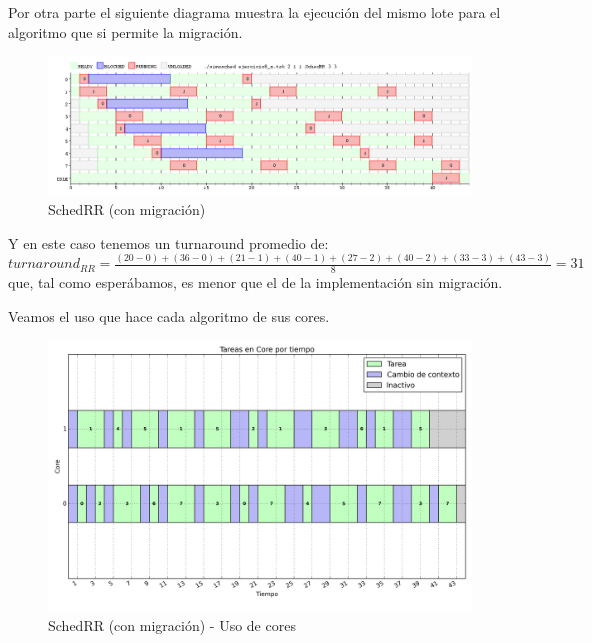\documentclass[a4paper,11pt]{article}
\begin{document}
		Por otra parte el siguiente diagrama muestra la ejecución del mismo lote para el algoritmo que si permite la migración.
		
		\begin{figure}[H]
		\centering
		\includegraphics[scale=.4, width=1\textwidth]{graficos/ej8-a1-2c}
		\caption{SchedRR (con migración)}
		\end{figure}

		Y en este caso tenemos un turnaround promedio de:\\
		
		\begin{math}
			turnaround_{RR} = \frac{(20-0)+(36-0)+(21-1)+(40-1)+(27-2)+(40-2)+(33-3)+(43-3)}{8} = 31
		\end{math}
		\\
	
		que, tal como esperábamos, es menor que el de la implementación sin migración.
		
		Veamos el uso que hace cada algoritmo de sus  cores.
		
		\begin{figure}[H]
		\centering
		\includegraphics[scale=.4, width=1\textwidth]{graficos/ej8-a1-2c-cores}
		\caption{SchedRR (con migración) - Uso de cores}
		\end{figure}
		
\end{document}
